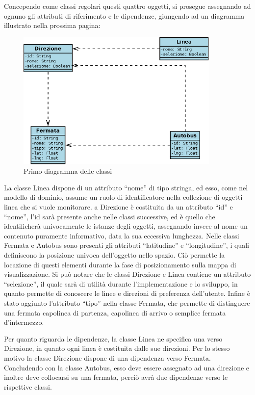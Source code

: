 Concependo come classi regolari questi quattro oggetti, si prosegue assegnando ad ognuno gli attributi di riferimento e le dipendenze, giungendo ad un diagramma illustrato nella prossima pagina:
\newpage
\vspace{1cm}
\begin{figure}[htbp]
\begin{center}
\includegraphics[width=10cm]{contents/images/dcd1}
\end{center}
\caption{Primo diagramma delle classi}
\label{fig:dcd}
\end{figure}
\vspace{1cm}
La classe Linea dispone di un attributo ``nome'' di tipo stringa, ed esso, come nel modello di dominio, assume un ruolo di identificatore nella collezione di oggetti linea che si vuole monitorare.
a Direzione è costituita da un attributo ``id'' e ``nome'', l'id sarà presente anche nelle classi successive, ed è quello che identificherà univocamente le istanze degli oggetti, assegnando invece al nome un contenuto puramente informativo, data la sua eccessiva lunghezza.
Nelle classi Fermata e Autobus sono presenti gli attributi ``latitudine'' e ``longitudine'', i quali definiscono la posizione univoca dell'oggetto nello spazio. Ciò permette la locazione di questi elementi durante la fase di posizionamento sulla mappa di visualizzazione.
Si può notare che le classi Direzione e Linea contiene un attributo ``selezione'', il quale sarà di utilità durante l'implementazione e lo sviluppo, in quanto permette di conoscere le linee e direzioni di preferenza dell'utente.
Infine è stato aggiunto l'attributo ``tipo'' nella classe Fermata, che permette di distinguere una fermata capolinea di partenza, capolinea di arrivo o semplice fermata d'intermezzo.

Per quanto riguarda le dipendenze, la classe Linea ne specifica una verso Direzione, in quanto ogni linea è costituita dalle sue direzioni. Per lo stesso motivo la classe Direzione dispone di una dipendenza verso Fermata. Concludendo con la classe Autobus, esso deve essere assegnato ad una direzione e inoltre deve collocarsi su una fermata, perciò avrà due dipendenze verso le rispettive classi.

